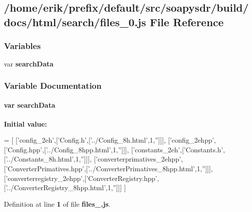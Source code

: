 \subsection{/home/erik/prefix/default/src/soapysdr/build/docs/html/search/files\+\_\+0.js File Reference}
\label{files__0_8js}
\subsubsection*{Variables}
\begin{DoxyCompactItemize}
\item 
var {\bf search\+Data}
\end{DoxyCompactItemize}


\subsubsection{Variable Documentation}
\paragraph[{search\+Data}]{\setlength{\rightskip}{0pt plus 5cm}var search\+Data}\label{files__0_8js_ad01a7523f103d6242ef9b0451861231e}
{\bfseries Initial value\+:}
\begin{DoxyCode}
=
[
  [\textcolor{stringliteral}{'config\_2eh'},[\textcolor{stringliteral}{'Config.h'},[\textcolor{stringliteral}{'../Config\_8h.html'},1,\textcolor{stringliteral}{''}]]],
  [\textcolor{stringliteral}{'config\_2ehpp'},[\textcolor{stringliteral}{'Config.hpp'},[\textcolor{stringliteral}{'../Config\_8hpp.html'},1,\textcolor{stringliteral}{''}]]],
  [\textcolor{stringliteral}{'constants\_2eh'},[\textcolor{stringliteral}{'Constants.h'},[\textcolor{stringliteral}{'../Constants\_8h.html'},1,\textcolor{stringliteral}{''}]]],
  [\textcolor{stringliteral}{'converterprimatives\_2ehpp'},[\textcolor{stringliteral}{'ConverterPrimatives.hpp'},[\textcolor{stringliteral}{'../ConverterPrimatives\_8hpp.html'},1,\textcolor{stringliteral}{''}]]],
  [\textcolor{stringliteral}{'converterregistry\_2ehpp'},[\textcolor{stringliteral}{'ConverterRegistry.hpp'},[\textcolor{stringliteral}{'../ConverterRegistry\_8hpp.html'},1,\textcolor{stringliteral}{''}]]]
]
\end{DoxyCode}


Definition at line {\bf 1} of file {\bf files\+\_.\+js}.

